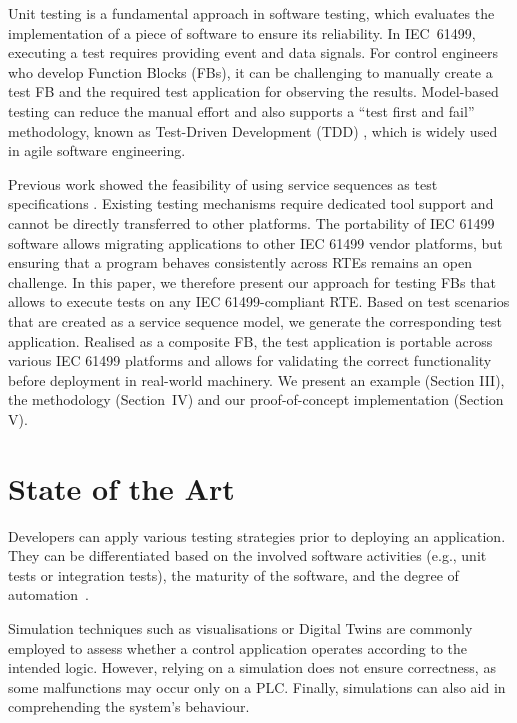 \begin{bibunit}
Unit testing is a fundamental approach in software testing, which evaluates the implementation of a piece of software \cite{softwareTesting} to ensure its reliability. In IEC~61499, executing a test requires providing event and data signals. For control engineers who develop Function Blocks (FBs), it can be challenging to manually create a test FB and the required test application for observing the results. Model-based testing can reduce the manual effort and also supports a ``test first and fail'' methodology, known as Test-Driven Development (TDD) \cite{hametner2014}, which is widely used in agile software engineering.

Previous work showed the feasibility of using service sequences as test specifications \cite{wiesmayr2021,hametner2014}. 
Existing testing mechanisms require dedicated tool support and cannot be directly transferred to other platforms. The portability of IEC 61499 software allows migrating applications to other IEC 61499 vendor platforms, but ensuring that a program behaves consistently across RTEs remains an open challenge. 
In this paper, we therefore present our approach for testing FBs that allows to execute tests on any IEC 61499-compliant RTE. Based on test scenarios that are created as a service sequence model, we generate the corresponding test application. %
Realised as a composite FB, the test application is portable across various IEC 61499 platforms and allows for validating the correct functionality before deployment in real-world machinery. We present an example (Section III), the methodology (Section~IV) and our proof-of-concept implementation (Section V).

\section{State of the Art}
Developers can apply various testing strategies prior to deploying an application. They can be differentiated based on the involved software activities (e.g., unit tests or integration tests), the maturity of the software, and the degree of automation~\cite{softwareTesting}. 

Simulation techniques such as visualisations or Digital Twins are commonly employed to assess whether a control application operates according to the intended logic. However, relying on a simulation does not ensure correctness, as some malfunctions may occur only on a PLC. Finally, simulations can also aid in comprehending the system's behaviour.


\end{bibunit}
